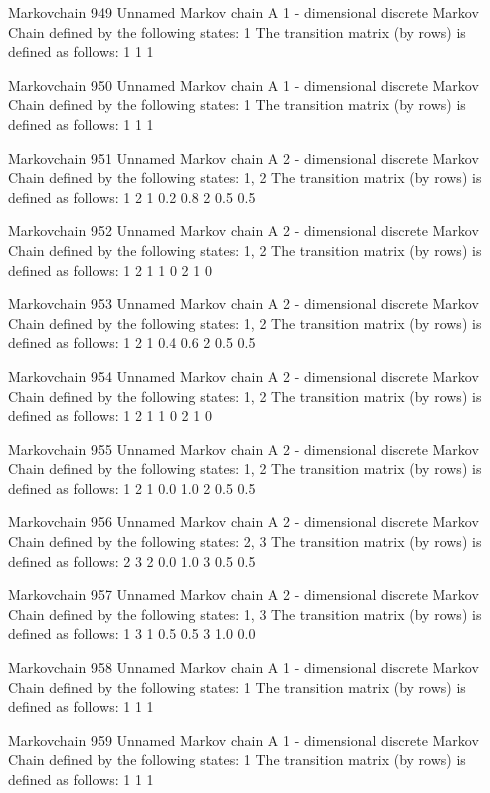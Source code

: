 \documentclass[
  nojss]{jss}
\begin{document}
\begin{CodeChunk}
\begin{CodeOutput}
Markovchain  949 
Unnamed Markov chain 
 A  1 - dimensional discrete Markov Chain defined by the following states: 
 1 
 The transition matrix  (by rows)  is defined as follows: 
  1
1 1

Markovchain  950 
Unnamed Markov chain 
 A  1 - dimensional discrete Markov Chain defined by the following states: 
 1 
 The transition matrix  (by rows)  is defined as follows: 
  1
1 1

Markovchain  951 
Unnamed Markov chain 
 A  2 - dimensional discrete Markov Chain defined by the following states: 
 1, 2 
 The transition matrix  (by rows)  is defined as follows: 
    1   2
1 0.2 0.8
2 0.5 0.5

Markovchain  952 
Unnamed Markov chain 
 A  2 - dimensional discrete Markov Chain defined by the following states: 
 1, 2 
 The transition matrix  (by rows)  is defined as follows: 
  1 2
1 1 0
2 1 0

Markovchain  953 
Unnamed Markov chain 
 A  2 - dimensional discrete Markov Chain defined by the following states: 
 1, 2 
 The transition matrix  (by rows)  is defined as follows: 
    1   2
1 0.4 0.6
2 0.5 0.5

Markovchain  954 
Unnamed Markov chain 
 A  2 - dimensional discrete Markov Chain defined by the following states: 
 1, 2 
 The transition matrix  (by rows)  is defined as follows: 
  1 2
1 1 0
2 1 0

Markovchain  955 
Unnamed Markov chain 
 A  2 - dimensional discrete Markov Chain defined by the following states: 
 1, 2 
 The transition matrix  (by rows)  is defined as follows: 
    1   2
1 0.0 1.0
2 0.5 0.5

Markovchain  956 
Unnamed Markov chain 
 A  2 - dimensional discrete Markov Chain defined by the following states: 
 2, 3 
 The transition matrix  (by rows)  is defined as follows: 
    2   3
2 0.0 1.0
3 0.5 0.5

Markovchain  957 
Unnamed Markov chain 
 A  2 - dimensional discrete Markov Chain defined by the following states: 
 1, 3 
 The transition matrix  (by rows)  is defined as follows: 
    1   3
1 0.5 0.5
3 1.0 0.0

Markovchain  958 
Unnamed Markov chain 
 A  1 - dimensional discrete Markov Chain defined by the following states: 
 1 
 The transition matrix  (by rows)  is defined as follows: 
  1
1 1

Markovchain  959 
Unnamed Markov chain 
 A  1 - dimensional discrete Markov Chain defined by the following states: 
 1 
 The transition matrix  (by rows)  is defined as follows: 
  1
1 1


\end{CodeOutput}
\end{CodeChunk}
\end{document}
